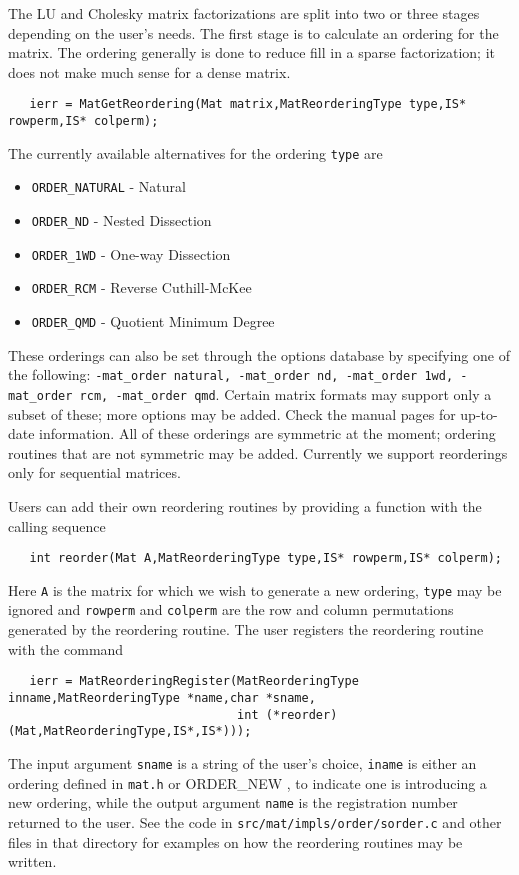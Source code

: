{The LU and Cholesky 
matrix factorizations are split into 
two or three stages depending on the user's needs. The first stage is 
to calculate an ordering for the matrix.  The ordering generally is 
done to reduce fill in a sparse factorization; it does not make much 
sense for a dense matrix.  
\begin{verbatim}
   ierr = MatGetReordering(Mat matrix,MatReorderingType type,IS* rowperm,IS* colperm); 
\end{verbatim}
The currently available alternatives for the ordering {\tt type} are 
\begin{itemize}
\item {\tt ORDER\_NATURAL} - Natural
\item {\tt ORDER\_ND} - Nested Dissection
\item {\tt ORDER\_1WD} - One-way Dissection
\item {\tt ORDER\_RCM} - Reverse Cuthill-McKee
\item {\tt ORDER\_QMD} - Quotient Minimum Degree
\end{itemize}
These orderings can also be set through the options database by specifying 
one of the following:  {\tt -mat\_order natural, -mat\_order nd, 
-mat\_order 1wd, -mat\_order rcm, -mat\_order qmd}.
  
  
  
 
Certain matrix formats may support only a subset of these; more options may 
be added. Check the manual pages for up-to-date information. All of these orderings are 
symmetric at the moment; ordering routines that are 
not symmetric may be added. Currently we support reorderings only for 
sequential matrices.

Users can add their own reordering routines 
by providing a function with the calling sequence
\begin{verbatim}
   int reorder(Mat A,MatReorderingType type,IS* rowperm,IS* colperm);
\end{verbatim}
Here {\tt A} is the matrix for which we wish to generate a new ordering, 
{\tt type} may be ignored and {\tt rowperm} and {\tt colperm} are the row
and column permutations generated by the reordering routine.
The user registers the reordering routine
with the command
\begin{verbatim}
   ierr = MatReorderingRegister(MatReorderingType inname,MatReorderingType *name,char *sname,
                                int (*reorder)(Mat,MatReorderingType,IS*,IS*)));
\end{verbatim}
The   
input argument {\tt *sname} is a string of the user's choice, {\tt iname} is either 
an ordering defined in {\tt mat.h} or {ORDER\_NEW} ,
to indicate one is introducing a new ordering, while the output
argument {\tt *name} is the registration number returned to the user.
See the code in {\tt src/mat/impls/order/sorder.c} and other files in that 
directory for examples on how the reordering routines may be written.

}
